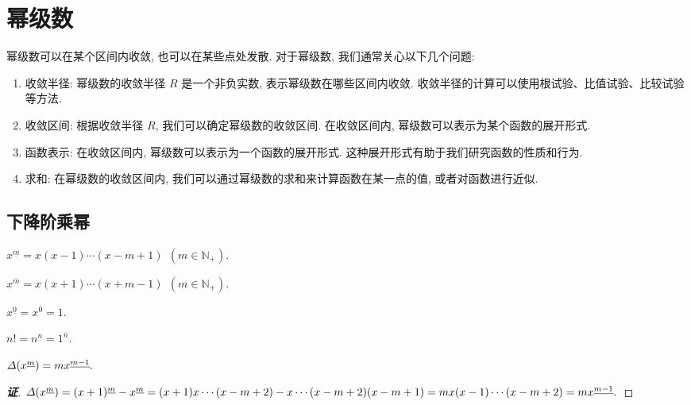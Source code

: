 \section{幂级数}

幂级数可以在某个区间内收敛, 也可以在某些点处发散. 对于幂级数, 我们通常关心以下几个问题:

\begin{enumerate}
    \item 收敛半径: 幂级数的收敛半径 $R$ 是一个非负实数, 表示幂级数在哪些区间内收敛. 收敛半径的计算可以使用根试验、比值试验、比较试验等方法.
    \item 收敛区间: 根据收敛半径 $R$, 我们可以确定幂级数的收敛区间. 在收敛区间内, 幂级数可以表示为某个函数的展开形式.
    \item 函数表示: 在收敛区间内, 幂级数可以表示为一个函数的展开形式. 这种展开形式有助于我们研究函数的性质和行为.
    \item 求和: 在幂级数的收敛区间内, 我们可以通过幂级数的求和来计算函数在某一点的值, 或者对函数进行近似.
\end{enumerate}

\subsection{下降阶乘幂}

\begin{definition}[下降阶乘幂]
    $x^{\underline{m} }=x(x-1)\cdots(x-m+1)~~(m\in\mathbb{N}_+).$
\end{definition}

\begin{definition}[上升阶乘幂]
    $x^{\overline{m}}=x(x+1)\cdots(x+m-1)~~(m\in\mathbb{N}_+).$
\end{definition}

\begin{definition}
    $x^{\underline{0}}=x^{\overline{0}}=1.$
\end{definition}

\begin{theorem}[阶乘与阶乘幂]
    $n!=n^{\underline{n}}=1^{\overline{n}}.$
\end{theorem}

\begin{theorem}
    $\varDelta \qty(x^{\underline{m}})=mx^{\underline{m-1}}.$
\end{theorem}
\begin{proof}[{\songti \textbf{证}}]
    $\varDelta\qty(x^{\underline{m}})=(x+1)^{\underline{m}}-x^{\underline{m}}=(x+1)x\cdots(x-m+2)-x\cdots(x-m+2)(x-m+1)=mx(x-1)\cdots(x-m+2)=mx^{\underline{m-1}}.$
\end{proof}

